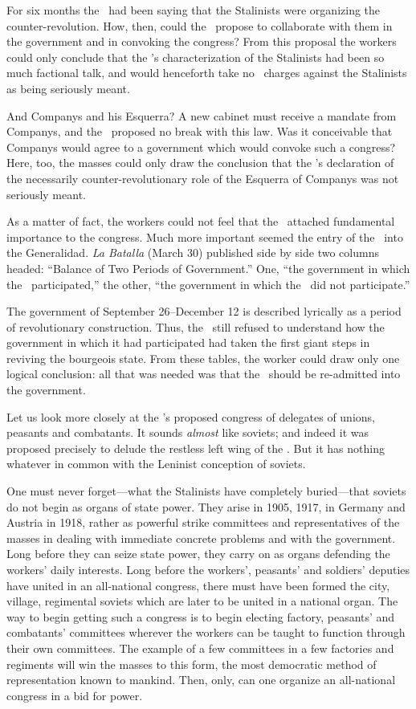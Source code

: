 For six months the \POUM\ had been saying that the Stalinists were organizing the counter-revolution. How, then, could the \POUM\ propose to collaborate with them in the government and in convoking the congress? From this proposal the workers could only conclude that the \POUM’s characterization of the Stalinists had been so much factional talk, and would henceforth take no \POUM\ charges against the Stalinists as being seriously meant.

And Companys and his Esquerra? A new cabinet must receive a mandate from Companys, and the \POUM\ proposed no break with this law. Was it conceivable that Companys would agree to a government which would convoke such a congress? Here, too, the masses could only draw the conclusion that the \POUM’s declaration of the necessarily counter-revolutionary role of the Esquerra of Companys was not seriously meant.

As a matter of fact, the workers could not feel that the \POUM\ attached fundamental importance to the congress. Much more important seemed the entry of the \POUM\ into the Generalidad. \emph{La Batalla} (March 30) published side by side two columns headed: ``Balance of Two Periods of Government.'' One, ``the government in which the \POUM\ participated,'' the other, ``the government in which the \POUM\ did not participate.''

The government of September 26--December 12 is described lyrically as a period of revolutionary construction. Thus, the \POUM\ still refused to understand how the government in which it had participated had taken the first giant steps in reviving the bourgeois state. From these tables, the worker could draw only one logical conclusion: all that was needed was that the \POUM\ should be re-admitted into the government.

Let us look more closely at the \POUM’s proposed congress of delegates of unions, peasants and combatants. It sounds \emph{almost} like soviets; and indeed it was proposed precisely to delude the restless left wing of the \POUM. But it has nothing whatever in common with the Leninist conception of soviets.

One must never forget---what the Stalinists have completely bu\-ried---that soviets do not begin as organs of state power. They arise in 1905, 1917, in Germany and Austria in 1918, rather as powerful strike committees and representatives of the masses in dealing with immediate concrete problems and with the government. Long before they can seize state power, they carry on as organs defending the workers’ daily interests. Long before the workers’, peasants’ and soldiers' deputies have united in an all-national congress, there must have been formed the city, village, regimental soviets which are later to be united in a national organ. The way to begin getting such a congress is to begin electing factory, peasants’ and combatants’ committees wherever the workers can be taught to function through their own committees. The example of a few committees in a few factories and regiments will win the masses to this form, the most democratic method of representation known to mankind. Then, only, can one organize an all-national congress in a bid for power.
\noclub

